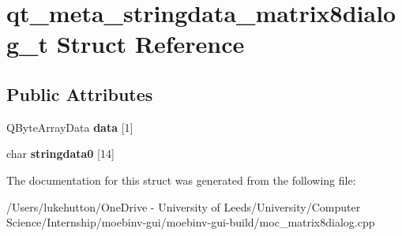 \hypertarget{structqt__meta__stringdata__matrix8dialog__t}{}\section{qt\+\_\+meta\+\_\+stringdata\+\_\+matrix8dialog\+\_\+t Struct Reference}
\label{structqt__meta__stringdata__matrix8dialog__t}
\subsection*{Public Attributes}
\begin{DoxyCompactItemize}
\item 
\mbox{\label{structqt__meta__stringdata__matrix8dialog__t_a9d7af3bd2bc8e32d83f86bc8f2f6fcd5}} 
Q\+Byte\+Array\+Data {\bfseries data} \mbox{[}1\mbox{]}
\item 
\mbox{\label{structqt__meta__stringdata__matrix8dialog__t_a830bc0f3c0e2785540c9fbcabea43849}} 
char {\bfseries stringdata0} \mbox{[}14\mbox{]}
\end{DoxyCompactItemize}


The documentation for this struct was generated from the following file\+:\begin{DoxyCompactItemize}
\item 
/\+Users/lukehutton/\+One\+Drive -\/ University of Leeds/\+University/\+Computer Science/\+Internship/moebinv-\/gui/moebinv-\/gui-\/build/moc\+\_\+matrix8dialog.\+cpp\end{DoxyCompactItemize}
